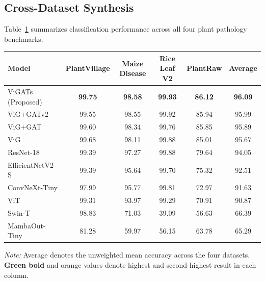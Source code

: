 \documentclass[]{interact}
\theoremstyle{plain}
\theoremstyle{definition}
\theoremstyle{remark}
\newcommand{\bestresult}[1]{\textcolor{bestgreen}{\textbf{#1}}}
\newcommand{\secondresult}[1]{\textcolor{secondorange}{#1}}
\begin{document}
{\subsection{Cross-Dataset Synthesis}
\label{sec:summary_plant}

Table~\ref{tab:summary_plant} summarizes classification performance across all four plant pathology benchmarks.

\begin{table}[H]
\small
\setlength{\tabcolsep}{4.5pt}
{\begin{tabular}{lccccc} \toprule
\textbf{Model} & \textbf{PlantVillage} & \textbf{Maize Disease} & \textbf{Rice Leaf V2} & \textbf{PlantRaw} & \textbf{Average} \\ \midrule
ViGATs (Proposed) & \bestresult{99.75} & \bestresult{98.58} & \bestresult{99.93} & \bestresult{86.12} & \bestresult{96.09} \\
ViG+GATv2 \citep{brody2022gat} & 99.55 & \secondresult{98.55} & \secondresult{99.92} & \secondresult{85.94} & \secondresult{95.99} \\
ViG+GAT \citep{velickovic2018graph} & 99.60 & 98.34 & 99.76 & 85.85 & 95.89 \\
ViG \citep{han2022vision} & \secondresult{99.68} & 98.11 & 99.88 & 85.01 & 95.67 \\
ResNet-18 \citep{he2016deep} & 99.39 & 97.27 & 99.88 & 79.64 & 94.05 \\
EfficientNetV2-S \citep{tan2021efficientnetv2} & 99.39 & 95.64 & 99.70 & 75.32 & 92.51 \\
ConvNeXt-Tiny \citep{liu2022convnext} & 97.99 & 95.77 & 99.81 & 72.97 & 91.63 \\
ViT \citep{dosovitskiy2020image} & 99.31 & 93.97 & 99.29 & 70.91 & 90.87 \\
Swin-T \citep{liu2021swin} & 98.83 & 71.03 & 39.09 & 56.63 & 66.39 \\
MambaOut-Tiny \citep{yu2024mambaout} & 81.28 & 59.97 & 56.15 & 63.78 & 65.29 \\
\bottomrule
\end{tabular}}
\label{tab:summary_plant}
\parbox{\textwidth}{\vspace{2pt}\footnotesize\textit{Note:} Average denotes the unweighted mean accuracy across the four datasets. \bestresult{Green bold} and \secondresult{orange} values denote highest and second-highest result in each column.}
\end{table}

}
\end{document}
